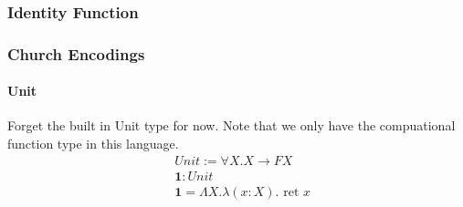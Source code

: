 \documentclass{article}
\begin{document}
\subsubsection{Identity Function}

\begin{prooftree}
\end{prooftree}

\subsubsection{Church Encodings}
\paragraph{Unit}
Forget the built in Unit type for now. Note that we only have the compuational function type in this language.
\begin{align*}
    &Unit := \forall X . X \rightarrow F X\\
    &\mathbf{1} : Unit\\
    &\mathbf{1} = \Lambda X . \lambda (x : X) . \textrm{ ret } x\\
\end{align*}
\end{document}
